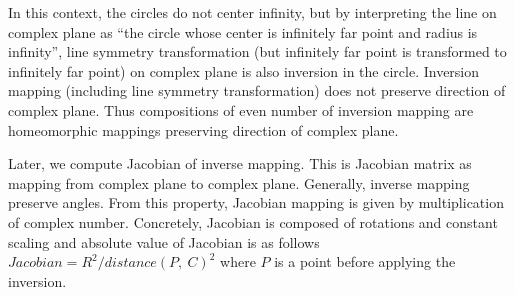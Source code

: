 In this context, the circles do not center infinity, but 
by interpreting the line on complex plane as ``the circle whose center is
infinitely far point and radius is infinity'', 
line symmetry transformation (but infinitely far point is
transformed to infinitely far point) on complex plane 
is also inversion in the circle.
Inversion mapping (including line symmetry transformation) does not
preserve direction of complex plane.
Thus compositions of even number of inversion mapping are homeomorphic
mappings preserving direction of complex plane.

Later, we compute Jacobian of inverse mapping.
This is Jacobian matrix as mapping from complex plane to complex plane.
Generally, inverse mapping preserve angles.
From this property, Jacobian mapping is given by multiplication of complex
number.
Concretely, Jacobian is composed of rotations and constant scaling
and absolute value of Jacobian is as follows
$Jacobian = R^2 / distance(P,~C)^2$
where $P$ is a point before applying the inversion.

